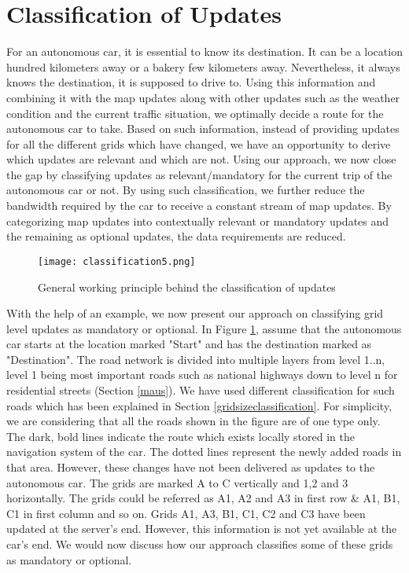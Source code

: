 \section{Classification of Updates} \label{classificationofupdates}
For an autonomous car, it is essential to know its destination. It can be a location hundred kilometers away or a bakery few kilometers away. Nevertheless, it always knows the destination, it is supposed to drive to. Using this information and combining it with the map updates along with other updates such as the weather condition and the current traffic situation, we optimally decide a route for the autonomous car to take. Based on such information, instead of providing updates for all the different grids which have changed, we have an opportunity to derive which updates are relevant and which are not. Using our approach, we now close the gap by classifying updates as relevant/mandatory for the current trip of the autonomous car or not. By using such classification, we further reduce the bandwidth required by the car to receive a constant stream of map updates. By categorizing map updates into contextually relevant or mandatory updates and the remaining as optional updates, the data requirements are reduced. \\

\begin{figure}
\centering
\texttt{[image: classification5.png]}
\caption{General working principle behind the classification of updates}
\label{fg:classificationofmapupdate}
\end{figure}

With the help of an example, we now present our approach on classifying grid level updates as mandatory or optional. In Figure \ref{fg:classificationofmapupdate}, assume that the autonomous car starts at the location marked "Start" and has the destination marked as "Destination". The road network is divided into multiple layers from level 1..n, level 1 being most important roads such as national highways down to level n for residential streets (Section \ref{maus}). We have used different classification for such roads which has been explained in Section \ref{gridsizeclassification}. For simplicity, we are considering that all the roads shown in the figure are of one type only. The dark, bold lines indicate the route which exists locally stored in the navigation system of the car. The dotted lines represent the newly added roads in that area. However, these changes have not been delivered as updates to the autonomous car. The grids are marked A to C vertically and 1,2 and 3 horizontally. The grids could be referred as A1, A2 and A3 in first row \& A1, B1, C1 in first column and so on. Grids A1, A3, B1, C1, C2 and C3 have been updated at the server's end. However, this information is not yet available at the car's end. We would now discuss how our approach classifies some of these grids as mandatory or optional.
